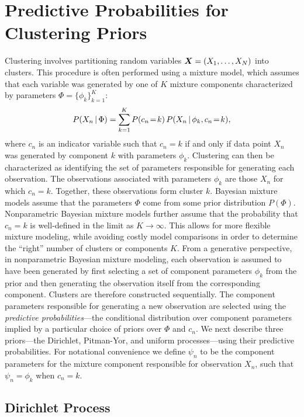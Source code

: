 \documentclass[twoside]{article}
\begin{document}
\section{Predictive Probabilities for Clustering Priors}
\label{priors}

Clustering involves partitioning random variables $\boldsymbol{X} = (X_1, \ldots,
X_N)$ into clusters. This procedure is often performed using a mixture
model, which assumes that each variable was generated by one of $K$
mixture components characterized by parameters $\Phi = \{ \phi_k
\}_{k=1}^K$:
\begin{eqnarray}
P(X_n \,|\,\Phi)=\sum_{k=1}^K P(c_n \!=\! k)\,P(X_n \,|\, \phi_k,
c_n \!=\! k),
\end{eqnarray}
where $c_n$ is an indicator variable such that $c_{n}=k$ if and only
if data point $X_n$ was generated by component $k$ with parameters
$\phi_k$. Clustering can then be characterized as identifying the set
of parameters responsible for generating each observation. The
observations associated with parameters $\phi_k$ are those $X_n$ for
which $c_n=k$. Together, these observations form cluster $k$. Bayesian
mixture models assume that the parameters $\Phi$ come from some prior
distribution $P(\Phi)$. Nonparametric Bayesian mixture models further
assume that the probability that $c_n=k$ is well-defined in the limit
as $K\rightarrow\infty$. This allows for more flexible mixture
modeling, while avoiding costly model comparisons in order to
determine the ``right'' number of clusters or components $K$.  From a
generative perspective, in nonparametric Bayesian mixture modeling,
each observation is assumed to have been generated by first selecting
a set of component parameters $\phi_k$ from the prior and then
generating the observation itself from the corresponding
component. Clusters are therefore constructed sequentially. The
component parameters responsible for generating a new observation are
selected using the \emph{predictive probabilities}---the conditional
distribution over component parameters implied by a particular choice
of priors over $\Phi$ and $c_n$. We next describe three priors---the
Dirichlet, Pitman-Yor, and uniform processes---using their predictive
probabilities. For notational convenience we define $\psi_n$ to be the
component parameters for the mixture component responsible for
observation $X_n$, such that $\psi_n = \phi_k$ when $c_n=k$.

\subsection{Dirichlet Process}
\end{document}
